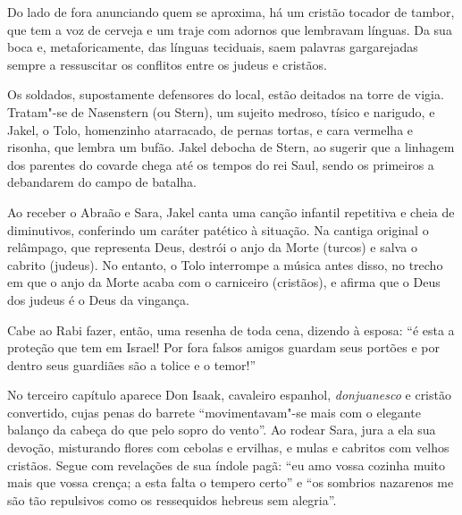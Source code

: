 \documentclass[12pt]{extarticle}
\begin{document}
Do lado de fora anunciando quem se aproxima, há um cristão tocador de
tambor, que tem a voz de cerveja e um traje com adornos que lembravam
línguas. Da sua boca e, metaforicamente, das línguas teciduais, saem
palavras gargarejadas sempre a ressuscitar os conflitos entre os judeus
e cristãos.

Os soldados, supostamente defensores do local, estão deitados na torre
de vigia. Tratam"-se de Nasenstern (ou Stern), um sujeito medroso, tísico
e narigudo, e Jakel, o Tolo, homenzinho atarracado, de pernas tortas, e
cara vermelha e risonha, que lembra um bufão. Jakel debocha de Stern, ao
sugerir que a linhagem dos parentes do covarde chega até os tempos do
rei Saul, sendo os primeiros a debandarem do campo de batalha.

Ao receber o Abraão e Sara, Jakel canta uma canção infantil repetitiva e
cheia de diminutivos, conferindo um caráter patético à situação. Na
cantiga original o relâmpago, que representa Deus, destrói o anjo da
Morte (turcos) e salva o cabrito (judeus). No entanto, o Tolo interrompe
a música antes disso, no trecho em que o anjo da Morte acaba com o
carniceiro (cristãos), e afirma que o Deus dos judeus é o Deus da
vingança.




Cabe ao Rabi fazer, então, uma resenha de toda cena, dizendo à esposa:
``é esta a proteção que tem em Israel! Por fora falsos amigos guardam
seus portões e por dentro seus guardiães são a tolice e o temor!''

No terceiro capítulo aparece Don Isaak, cavaleiro espanhol, \emph{donjuanesco}
e cristão convertido, cujas penas do barrete ``movimentavam"-se mais com
o elegante balanço da cabeça do que pelo sopro do vento''. Ao rodear
Sara, jura a ela sua devoção, misturando flores com cebolas e ervilhas,
e mulas e cabritos com velhos cristãos. Segue com revelações de sua
índole pagã: ``eu amo vossa cozinha muito mais que vossa crença; a esta
falta o tempero certo'' e ``os sombrios nazarenos me são tão repulsivos
como os ressequidos hebreus sem alegria''.






\end{document}
